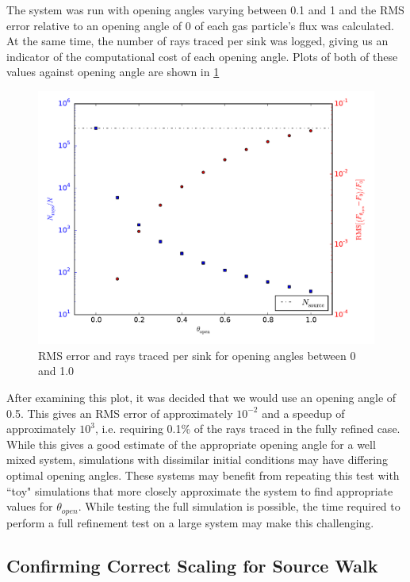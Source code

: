 The system was run with opening angles varying between 0.1 and 1 and the RMS error relative to an opening angle of 0 of each gas particle's flux was calculated. At the same time, the number of rays traced per sink was logged, giving us an indicator of the computational cost of each opening angle. Plots of both of these values against opening angle are shown in \ref{fig:openingTest}
\begin{figure} [H]
    \centering
    \includegraphics[width=\textwidth]{plots/CH4/opening_angle.pdf}
    \caption{RMS error and rays traced per sink for opening angles between 0 and 1.0}
    \label{fig:openingTest}
\end{figure}
After examining this plot, it was decided that we would use an opening angle of 0.5. This gives an RMS error of approximately $10^{-2}$ and a speedup of approximately $10^3$, i.e. requiring 0.1\% of the rays traced in the fully refined case. While this gives a good estimate of the appropriate opening angle for a well mixed system, simulations with dissimilar initial conditions may have differing optimal opening angles. These systems may benefit from repeating this test with ``toy" simulations that more closely approximate the system to find appropriate values for $\theta_{open}$. While testing the full simulation is possible, the time required to perform a full refinement test on a large system may make this challenging.

\subsection{Confirming Correct Scaling for Source Walk}

